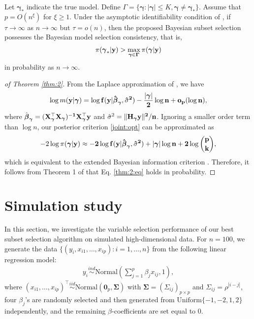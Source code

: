 \documentclass[twocolumn]{svjour3}       %
\newcommand{\T}{\top} %
\newcommand{\uH}{\bf H} %
\newcommand{\uX}{\bf X} %
\newcommand{\uy}{\bf y} %
\newcommand{\0}{\boldsymbol 0} %
\newcommand{\1}{\boldsymbol 1} %
\newcommand{\ubeta}{\boldsymbol \beta} %
\newcommand{\bg}{\boldsymbol \gamma} %
\newcommand{\uSigma}{\boldsymbol \Sigma} %
\begin{document}
\begin{theorem}\label{thm:2} Let $\bg_*$ indicate the true model. Define $\Gamma=\{\bg:|\bg|\leq K,\bg\neq \bg_*\}$. Assume that $p=O(n^\xi)$ for $\xi\geq 1$. Under the asymptotic identifiability condition of \cite{chen2008extended}, if $\tau\to \infty$ as $n\to \infty$ but $\tau=o(n)$, then the proposed Bayesian subset selection possesses the Bayesian model selection consistency, that is,
\begin{eqnarray}\label{thm:2:eq}
\pi(\bg_*|\uy) > \max_{ \bg \in \Gamma }\pi(\bg|\uy)
\end{eqnarray}
in probability as $n\to \infty$.
\end{theorem}
\begin{proof}[of Theorem \ref{thm:2}]  From the Laplace approximation of \cite{kass1995}, we have
\begin{eqnarray*}
\log m(\uy|\bg) = \log f(\uy|\hat{\ubeta}_{\bg}, \hat{\sigma}^2)-\frac{|\bg|}{2}\log n+o_p(\log n ),
\end{eqnarray*}
where  $\hat{\ubeta}_{\bg}= (\uX_{\bg}^{\T} \uX_{\bg})^{-1} \uX_{\bg}^{\T} \uy$ and $\hat{\sigma}^2=\|\uH_{\bg}\uy\|^2/n$. Ignoring a smaller order term than $\log n$, our posterior criterion \eqref{joint:opt} can be approximated as 
\begin{eqnarray}\label{ebic}
-2 \log \pi(\bg |\uy) \approx -2 \log f(\uy|\hat{\ubeta}_{\bg},\hat{\sigma}^2)+{|\bg|}\log n+2\log \binom{p}{k},
\end{eqnarray}
which is equivalent to the extended Bayesian information criterion \cite{chen2008extended}. Therefore, it follows from Theorem 1 of \cite{chen2008extended} that Eq. \eqref{thm:2:eq} holds in probability.
\end{proof}


\section{Simulation study}\label{sec:5}
In this section, we investigate the variable selection performance of our best subset selection algorithm on simulated high-dimensional data. For $n=100$, we generate the data $\{(y_i,x_{i1},\ldots,x_{ip}):i=1,\ldots,n\}$ from the following linear regression model:
\begin{eqnarray*}
y_i\overset{ind}{\sim}\text{Normal}\left(\sum_{j=1}^p \beta_j x_{ij},1\right),
\end{eqnarray*}
where $(x_{i1},\ldots,x_{ip})^\T \overset{iid}{\sim}\text{Normal}(\0_p,\uSigma)$ with $\uSigma=(\Sigma_{ij})_{p\times p}$ and $\Sigma_{ij}=\rho^{|i-j|}$, four $\beta_j$'s are randomly selected and then generated from $\text{Uniform}\{-1,-2,1,2\}$ independently, and the remaining $\beta$-coefficients are set equal to $0$. 
\end{document}
